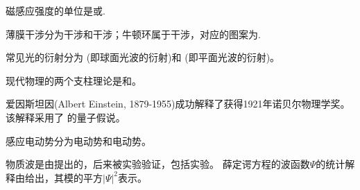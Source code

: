 \documentclass{njustexam}
\begin{document}
\begin{problem}
磁感应强度的单位是或. 
\end{problem}


\begin{problem}
薄膜干涉分为干涉和干涉；牛顿环属于干涉，对应的图案为. 
\end{problem}

\begin{problem}
  常见光的衍射分为 (即球面光波的衍射)和 (即平面光波的衍射)。
 \end{problem}

 \begin{problem}
  现代物理的两个支柱理论是和。
\end{problem}

\begin{problem}
爱因斯坦因(Albert Einstein, 1879-1955)成功解释了获得1921年诺贝尔物理学奖。该解释采用了
的量子假说。
\end{problem}

\begin{problem}
感应电动势分为电动势和电动势。 
\end{problem}





\begin{problem}
  物质波是由提出的，后来被实验验证，包括实验。
  薛定谔方程的波函数$\Psi$的统计解释由给出，其模的平方$|\Psi|^2$表示。 
\end{problem}
\end{document}
